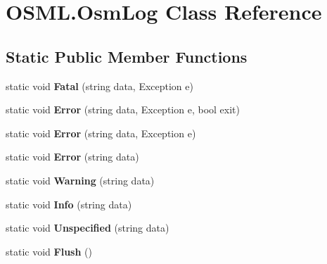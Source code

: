 \hypertarget{classOSML_1_1OsmLog}{}\section{O\+S\+M\+L.\+Osm\+Log Class Reference}
\label{classOSML_1_1OsmLog}
\subsection*{Static Public Member Functions}
\begin{DoxyCompactItemize}
\item 
\mbox{\label{classOSML_1_1OsmLog_a2452d19f6a76343ed6f89fba97c4017b}} 
static void {\bfseries Fatal} (string data, Exception e)
\item 
\mbox{\label{classOSML_1_1OsmLog_a69ada9334c7f60b4251bb4e6eb68245d}} 
static void {\bfseries Error} (string data, Exception e, bool exit)
\item 
\mbox{\label{classOSML_1_1OsmLog_aacb67b810e1ec891525c4b8075e42579}} 
static void {\bfseries Error} (string data, Exception e)
\item 
\mbox{\label{classOSML_1_1OsmLog_ab81194022230aec04b59f7e030a374ea}} 
static void {\bfseries Error} (string data)
\item 
\mbox{\label{classOSML_1_1OsmLog_aca6d253d2390bd01689095d46de11f99}} 
static void {\bfseries Warning} (string data)
\item 
\mbox{\label{classOSML_1_1OsmLog_af45aeaf7238c1a3319622c12d3577234}} 
static void {\bfseries Info} (string data)
\item 
\mbox{\label{classOSML_1_1OsmLog_ac60e36464c29a5a8275e7c9a2915d8e2}} 
static void {\bfseries Unspecified} (string data)
\item 
\mbox{\label{classOSML_1_1OsmLog_a80106c72d32ce40ea4a4428801f83872}} 
static void {\bfseries Flush} ()
\end{DoxyCompactItemize}

